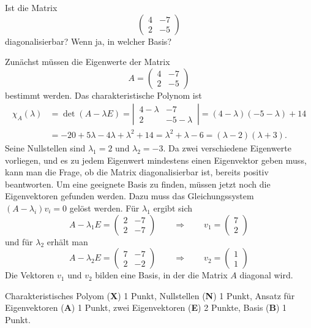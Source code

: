 Ist die Matrix
\[
\begin{pmatrix}
4&-7\\
2&-5
\end{pmatrix}
\]
diagonalisierbar? Wenn ja, in welcher Basis?


\begin{loesung}
Zunächst müssen die Eigenwerte der Matrix
\[
A=
\begin{pmatrix}
4&-7\\
2&-5
\end{pmatrix}
\]
bestimmt werden. Das
charakteristische Polynom ist
\begin{align*}
\chi_A(\lambda)&=
\det(A-\lambda E)
=
\left|\,\begin{matrix}4-\lambda&-7\\2&-5-\lambda\end{matrix}\,\right|
=(4-\lambda)(-5-\lambda)+14\\
&=-20+5\lambda-4\lambda+\lambda^2+14
=\lambda^2+\lambda-6=(\lambda -2)(\lambda +3).
\end{align*}
Seine Nullstellen sind $\lambda_1=2$ und $\lambda_2=-3$. Da zwei
verschiedene Eigenwerte vorliegen, und es zu jedem Eigenwert
mindestens einen Eigenvektor geben muss, kann man die Frage, ob
die Matrix diagonalisierbar ist, bereits positiv beantworten. Um
eine geeignete Basis zu finden, müssen jetzt noch die Eigenvektoren
gefunden werden. Dazu muss das Gleichungssystem $(A-\lambda_i)v_i=0$
gelöst werden. Für $\lambda_1$ ergibt sich
\[
A-\lambda_1 E=\begin{pmatrix}
2&-7\\
2&-7
\end{pmatrix}
\qquad \Rightarrow\qquad v_1=\begin{pmatrix}7\\2\end{pmatrix}
\]
und für $\lambda_2$ erhält man
\[
A-\lambda_2 E=\begin{pmatrix}
7&-7\\
2&-2
\end{pmatrix}
\qquad \Rightarrow\qquad v_2=\begin{pmatrix}1\\1\end{pmatrix}
\]
Die Vektoren $v_1$ und $v_2$ bilden eine Basis, in der die Matrix $A$
diagonal wird.
\end{loesung}

\begin{bewertung}
Charakteristisches Polyom ({\bf X}) 1 Punkt,
Nullstellen ({\bf N}) 1 Punkt,
Ansatz für Eigenvektoren ({\bf A}) 1 Punkt,
zwei Eigenvektoren ({\bf E}) 2 Punkte,
Basis ({\bf B}) 1 Punkt.
\end{bewertung}
